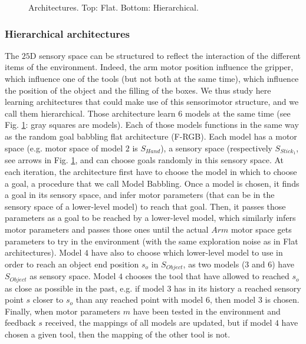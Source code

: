\documentclass[10pt,letterpaper]{article}
\begin{document}
			\begin{figure}[t]
				\center
				
				\vspace{-0.25cm}
				
				\vspace{-0.5cm}
				\caption{Architectures. Top: Flat. Bottom: Hierarchical.}
				\label{Architectures}					
				\vspace{-0.5cm}
			\end{figure}
				
		
		\subsubsection{Hierarchical architectures}
			
			The $25$D sensory space can be structured to reflect the interaction of the different items of the environment.
			Indeed, the arm motor position influence the gripper, which influence one of the tools (but not both at the same time), which influence the position of the object and the filling of the boxes.
			We thus study here learning architectures that could make use of this sensorimotor structure, and we call them hierarchical.
			Those architecture learn $6$ models at the same time (see Fig. \ref{Architectures}: gray squares are models). 
			Each of those models functions in the same way as the random goal babbling flat architecture (F-RGB). 
			Each model has a motor space (e.g. motor space of model $2$ is $S_{Hand}$), a sensory space (respectively $S_{Stick_1}$, see arrows in Fig. \ref{Architectures}, and can choose goals randomly in this sensory space.
			At each iteration, the architecture first have to choose the model in which to choose a goal, a procedure that we call Model Babbling.
			Once a model is chosen, it finds a goal in its sensory space, and infer motor parameters (that can be in the sensory space of a lower-level model) to reach that goal.
			Then, it passes those parameters as a goal to be reached by a lower-level model, 
			which similarly infers motor parameters and passes those ones until the actual $Arm$ motor space gets parameters to try in the environment (with the same exploration noise as in Flat architectures).
			Model $4$ have also to choose which lower-level model to use in order to reach an object end position $s_o$ in $S_{Object}$, as two models ($3$ and $6$) have $S_{Object}$ as sensory space. 
			Model $4$ chooses the tool that have allowed to reached $s_o$ as close as possible in the past, e.g. if model $3$ has in its history a reached sensory
			point $s$ closer to $s_o$ than any reached point with model $6$, then model $3$ is chosen.
			Finally, when motor parameters $m$ have been tested in the environment and feedback $s$ received, the mappings of all models are updated, but if model $4$ have chosen a given tool, then the mapping of the other tool is not.
			
\end{document}
